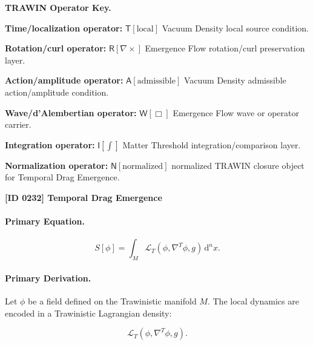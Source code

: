 \par\vspace{0.45\baselineskip}
\noindent\begin{minipage}[t]{\linewidth}
\begingroup
\small
\raggedright
\textbf{TRAWIN Operator Key.}\par
\noindent\textbf{Time/localization operator:} $\mathsf{T}\!\left[\mathrm{local}\right]$ Vacuum Density local source condition.\par
\noindent\textbf{Rotation/curl operator:} $\mathsf{R}\!\left[\nabla\times\right]$ Emergence Flow rotation/curl preservation layer.\par
\noindent\textbf{Action/amplitude operator:} $\mathsf{A}\!\left[\mathrm{admissible}\right]$ Vacuum Density admissible action/amplitude condition.\par
\noindent\textbf{Wave/d'Alembertian operator:} $\mathsf{W}\!\left[\Box\right]$ Emergence Flow wave or operator carrier.\par
\noindent\textbf{Integration operator:} $\mathsf{I}\!\left[\int\right]$ Matter Threshold integration/comparison layer.\par
\noindent\textbf{Normalization operator:} $\mathsf{N}\!\left[\mathrm{normalized}\right]$ normalized TRAWIN closure object for Temporal Drag Emergence.\par
\endgroup
\end{minipage}

\clearpage
\noindent\textbf{[ID 0232] Temporal Drag Emergence}\par
\vspace{0.35em}
\paragraph{Primary Equation.}
\begin{equation}
S[\phi]
=
\int_M
\mathcal{L}_T
\left(
\phi,\nabla^T\phi,g
\right)
\,\mathrm{d}^n x .
\end{equation}

\paragraph{Primary Derivation.}
Let $\phi$ be a field defined on the Trawinistic manifold $M$.  
The local dynamics are encoded in a Trawinistic Lagrangian density:

\begin{equation}
\mathcal{L}_T
\left(
\phi,\nabla^T\phi,g
\right).
\end{equation}


